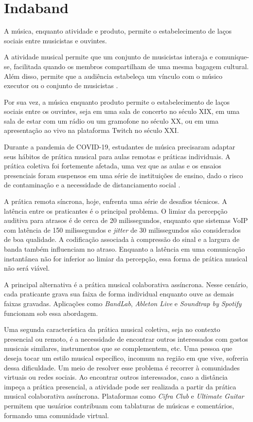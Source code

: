 \section{Indaband}
A música, enquanto atividade e produto, permite o estabelecimento de laços sociais
entre musicistas e ouvintes.

A atividade musical permite que um conjunto de musicistas interaja e
comunique-se, facilitada quando os membros compartilham de uma mesma bagagem
cultural. Além disso, permite que a audiência estabeleça um vínculo com
o músico executor ou o conjunto de musicistas \cite{cook2021music}.

Por sua vez, a música enquanto produto permite o estabelecimento de laços sociais
entre os ouvintes, seja em uma sala de concerto no século XIX, em uma sala de estar
com um rádio ou um gramofone no século XX, ou em uma apresentação ao vivo na
plataforma Twitch no século XXI.

Durante a pandemia de COVID-19, estudantes de música precisaram adaptar seus
hábitos de prática musical para aulas remotas e práticas individuais. A prática
coletiva foi fortemente afetada, uma vez que as aulas e os ensaios presenciais
foram suspensos em uma série de instituições de ensino, dado o risco de
contaminação e a necessidade de distanciamento social \cite{nusseck2021musical}.

A prática remota síncrona, hoje, enfrenta uma série de desafios técnicos. A
latência entre os praticantes é o principal problema. O limiar da percepção
auditiva para atrasos é de cerca de 20 milissegundos, enquanto que sistemas VoIP
com latência de 150 milissegundos e \textit{jitter} de 30 milissegundos são
considerados de boa qualidade. A codificação associada à compressão do sinal e a
largura de banda também influenciam no atraso. Enquanto a latência em uma
comunicação instantânea não for inferior ao limiar da percepção, essa forma de
prática musical não será viável.

A principal alternativa é a prática musical colaborativa assíncrona. Nesse
cenário, cada praticante grava sua faixa de forma individual enquanto ouve as
demais faixas gravadas. Aplicações como \textit{BandLab}, \textit{Ableton Live}
e \textit{Soundtrap by Spotify} funcionam sob essa abordagem.

Uma segunda característica da prática musical coletiva, seja no contexto
presencial ou remoto, é a necessidade de encontrar outros interessados com
gostos musicais similares, instrumentos que se complementem, etc. Uma pessoa que
deseja tocar um estilo musical específico, incomum na região em que vive,
sofreria dessa dificuldade. Um meio de resolver esse problema é recorrer à
comunidades virtuais ou redes sociais. Ao encontrar outros interessados, caso a
distância impeça a prática presencial, a atividade pode ser realizada a partir
da prática musical colaborativa assíncrona. Plataformas como \textit{Cifra Club}
e \textit{Ultimate Guitar} permitem que usuários contribuam com tablaturas de
músicas e comentários, formando uma comunidade virtual.


